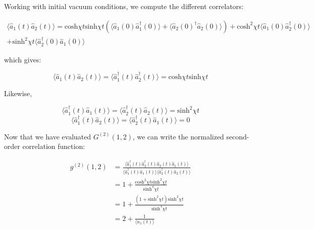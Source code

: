 \noindent Working with initial vacuum conditions, we compute the different correlators:

\begin{equation}
\begin{split}
   \langle \hat{a}_1(t) \hat{a}_2(t) \rangle = \mathrm{cosh} \chi t \mathrm{sinh} \chi t (\langle \hat{a}_1(0) \hat{a}_1^{\dagger}(0) \rangle+ \langle \hat{a}_2(0)^{\dagger} \hat{a}_2(0) \rangle) + \mathrm{cosh}^2 \chi t \langle \hat{a}_1(0) \hat{a}_2^{\dagger}(0) \rangle \\
   + \mathrm{sinh}^2 \chi t \langle \hat{a}_2^{\dagger}(0) \hat{a}_1(0) \rangle 
\end{split}
\end{equation}

\noindent which gives:

\begin{equation}
    \langle \hat{a}_1(t) \hat{a}_2(t) \rangle = \langle \hat{a}_1^{\dagger}(t) \hat{a}_2^{\dagger}(t) \rangle = \mathrm{cosh} \chi t \mathrm{sinh} \chi t
\end{equation}

\noindent Likewise,

\begin{equation}
     \langle \hat{a}_1^{\dagger}(t) \hat{a}_1(t) \rangle = \langle \hat{a}_2^{\dagger}(t) \hat{a}_2(t) \rangle = \mathrm{sinh}^2 \chi t
\end{equation}
\begin{equation}
    \langle \hat{a}_1^{\dagger}(t) \hat{a}_2(t) \rangle =  \langle \hat{a}_2^{\dagger}(t) \hat{a}_1(t) \rangle = 0
\end{equation}

\noindent Now that we have evaluated $G^{(2)}(1,2)$, we can write the normalized second-order correlation function:

\begin{equation}
\begin{aligned}
      g^{(2)}(1,2) & = \frac{\langle \hat{a}_1^{\dagger}(t) \hat{a}_2^{\dagger}(t) \hat{a}_2(t) \hat{a}_1(t) \rangle}{\langle \hat{a}_1^{\dagger}(t) \hat{a}_1(t) \rangle \langle \hat{a}_2^{\dagger}(t) \hat{a}_2(t) \rangle} \\
      & = 1 + \frac{\mathrm{cosh}^2 \chi t \mathrm{sinh}^2 \chi t}{\mathrm{sinh}^4 \chi t} \\
      & = 1+\frac{(1+\mathrm{sinh}^2 \chi t)\mathrm{sinh}^2 \chi t}{\mathrm{sinh}^4 \chi t} \\
      & = 2 + \frac{1}{\langle n_1(t) \rangle} 
      \label{eq:amp_g2_A}
\end{aligned}
\end{equation}

